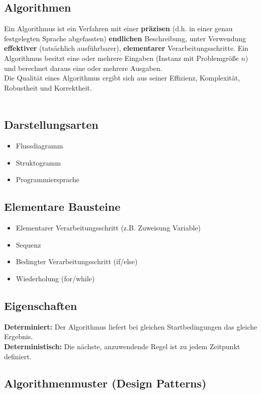 \documentclass[fs, footer]{latex4ei}
\begin{document}
\begin{multicols*}{4}
\section{Algorithmen}
Ein Algorithmus ist ein Verfahren mit einer \textbf{präzisen} (d.h. in einer genau festgelegten Sprache
abgefassten) \textbf{endlichen} Beschreibung, unter Verwendung \textbf{effektiver} (tatsächlich ausführbarer), \textbf{elementarer} Verarbeitungsschritte.
Ein Algorithmus besitzt eine oder mehrere Eingaben (Instanz mit Problemgröße $n$) und berechnet daraus eine oder mehrere Ausgaben.\\
Die Qualität eines Algorithmus ergibt sich aus seiner Effizienz, Komplexität, Robustheit und Korrektheit.\\
\\
\subsection{Darstellungsarten}
\begin{itemize}
\item Flussdiagramm
\item Struktogramm
\item Programmiersprache
\end{itemize}
\subsection{Elementare Bausteine}
\begin{itemize}
\item Elementarer Verarbeitungsschritt (z.B. Zuweisung Variable)
\item Sequenz
\item Bedingter Verarbeitungsschritt (if/else)
\item Wiederholung (for/while)
\end{itemize}
\subsection{Eigenschaften}
\textbf{Determiniert:} Der Algorithmus liefert bei gleichen Startbedingungen das gleiche Ergebnis.\\
\textbf{Deterministisch:} Die nächste, anzuwendende Regel ist zu jedem Zeitpunkt definiert.\\
\subsection{Algorithmenmuster (Design Patterns)}

\end{multicols*}
\end{document}
